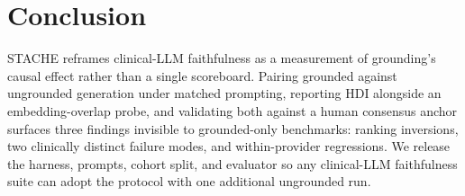 \documentclass{article}
\theoremstyle{plain}
\begin{document}
\section{Conclusion}
\label{sec:conclusion}

STACHE reframes clinical-LLM faithfulness as a measurement of grounding's causal effect rather than a single scoreboard. Pairing grounded against ungrounded generation under matched prompting, reporting HDI alongside an embedding-overlap probe, and validating both against a human consensus anchor surfaces three findings invisible to grounded-only benchmarks: ranking inversions, two clinically distinct failure modes, and within-provider regressions. We release the harness, prompts, cohort split, and evaluator so any clinical-LLM faithfulness suite can adopt the protocol with one additional ungrounded run.



\end{document}
